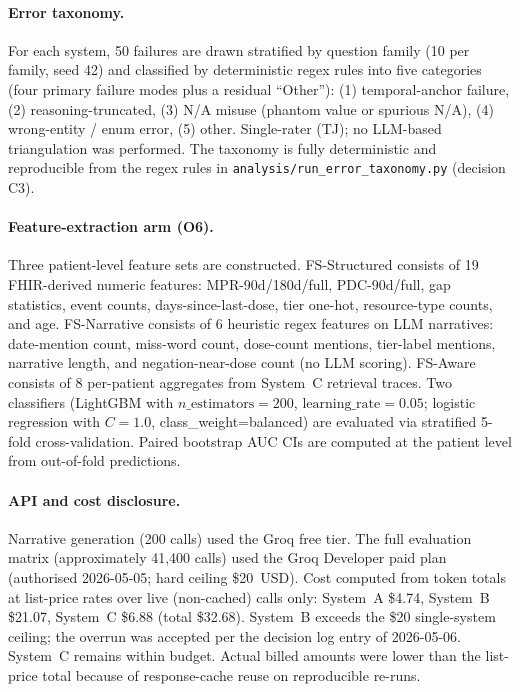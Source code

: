 \paragraph{Error taxonomy.}
For each system, 50 failures are drawn stratified by question family (10 per family, seed 42)
and classified by deterministic regex rules into five categories (four primary failure modes plus a residual ``Other''):
(1) temporal-anchor failure,
(2) reasoning-truncated,
(3) N/A misuse (phantom value or spurious N/A),
(4) wrong-entity / enum error,
(5) other.
Single-rater (TJ); no LLM-based triangulation was performed. The taxonomy is fully deterministic and reproducible from the regex rules in \texttt{analysis/run\_error\_taxonomy.py} (decision C3).

\paragraph{Feature-extraction arm (O6).}
Three patient-level feature sets are constructed.
FS-Structured consists of 19 FHIR-derived numeric features: MPR-90d/180d/full, PDC-90d/full,
gap statistics, event counts, days-since-last-dose, tier one-hot, resource-type counts, and age.
FS-Narrative consists of 6 heuristic regex features on LLM narratives: date-mention count,
miss-word count, dose-count mentions, tier-label mentions, narrative length, and negation-near-dose
count (no LLM scoring).
FS-Aware consists of 8 per-patient aggregates from System~C retrieval traces.
Two classifiers (LightGBM with $n\_\text{estimators}=200$, $\text{learning\_rate}=0.05$;
logistic regression with $C=1.0$, class\_weight=balanced) are evaluated via stratified 5-fold
cross-validation.  Paired bootstrap AUC CIs are computed at the patient level from
out-of-fold predictions.

\paragraph{API and cost disclosure.}
Narrative generation (200 calls) used the Groq free tier.  The full evaluation matrix
(approximately 41,400 calls) used the Groq Developer paid plan (authorised 2026-05-05;
hard ceiling \$20~USD).  Cost computed from token totals at list-price rates over live
(non-cached) calls only: System~A \$4.74, System~B \$21.07, System~C \$6.88 (total
\$32.68).  System~B exceeds the \$20 single-system ceiling; the overrun was accepted
per the decision log entry of 2026-05-06.  System~C remains within budget.  Actual
billed amounts were lower than the list-price total because of response-cache reuse
on reproducible re-runs.
